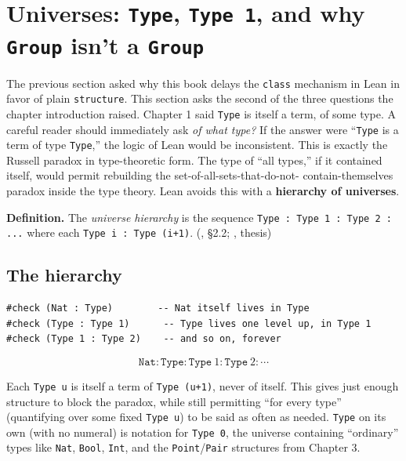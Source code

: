 \section{\texorpdfstring{Universes: \texttt{Type}, \texttt{Type\ 1}, and why \texttt{Group} isn't a \texttt{Group}}{Universes: Type, Type 1, and why Group isn't a Group}}\label{sec:06-rigor-check:02-universes:1}

The previous section asked why this book delays the \texttt{class} mechanism in Lean in favor of plain \texttt{structure}. This section asks the second of the three questions the chapter introduction raised. Chapter 1 said \texttt{Type} is itself a term, of some type. A careful reader should immediately ask \emph{of what type?} If the answer were ``\texttt{Type} is a term of type \texttt{Type},'' the logic of Lean would be inconsistent. This is exactly the Russell paradox in type-theoretic form. The type of ``all types,'' if it contained itself, would permit rebuilding the set-of-all-sets-that-do-not- contain-themselves paradox inside the type theory. Lean avoids this with a \textbf{hierarchy of universes}.

\textbf{Definition.} The \emph{universe hierarchy} is the sequence \texttt{Type : Type 1 : Type 2 : ...} where each \texttt{Type i : Type (i+1)}. (\cite{TPIL4}, §2.2; \cite{Girard1972}, thesis)

\subsection{The hierarchy}\label{sec:06-rigor-check:02-universes:2}

\begin{lstlisting}
#check (Nat : Type)        -- Nat itself lives in Type
#check (Type : Type 1)      -- Type lives one level up, in Type 1
#check (Type 1 : Type 2)    -- and so on, forever
\end{lstlisting}

\[
\mathtt{Nat} : \mathtt{Type} : \mathtt{Type}\ 1 : \mathtt{Type}\ 2 : \cdots
\]

Each \texttt{Type u} is itself a term of \texttt{Type (u+1)}, never of itself. This gives just enough structure to block the paradox, while still permitting ``for every type'' (quantifying over some fixed \texttt{Type u}) to be said as often as needed. \texttt{Type} on its own (with no numeral) is notation for \texttt{Type 0}, the universe containing ``ordinary'' types like \texttt{Nat}, \texttt{Bool}, \texttt{Int}, and the \texttt{Point}/\texttt{Pair} structures from Chapter 3.

